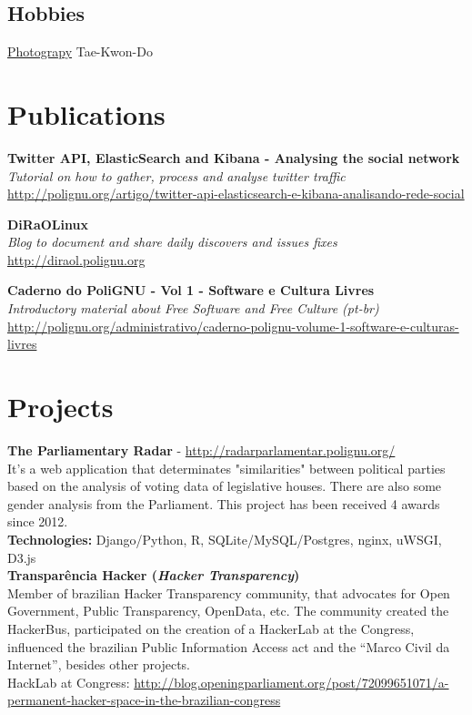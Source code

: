 \documentclass[]{friggeri-cv}
\begin{document}
\begin{aside}
  \section{Hobbies}
      \href{http://olhares.com/diraol}{Photograpy}
      Tae-Kwon-Do
\end{aside}

\section{Publications}
\textbf{Twitter API, ElasticSearch and Kibana - Analysing the social network}\\
\emph{Tutorial on how to gather, process and analyse twitter traffic}\\
\href{http://polignu.org/artigo/twitter-api-elasticsearch-e-kibana-analisando-rede-social}{http://polignu.org/artigo/twitter-api-elasticsearch-e-kibana-analisando-rede-social}

\textbf{DiRaOLinux}\\
\emph{Blog to document and share daily discovers and issues fixes}\\
\href{http://diraol.polignu.org}{http://diraol.polignu.org}

\textbf{Caderno do PoliGNU - Vol 1 - Software e Cultura Livres}\\
\emph{Introductory material about Free Software and Free Culture (pt-br)}\\
\href{http://polignu.org/administrativo/caderno-polignu-volume-1-software-e-culturas-livres}{http://polignu.org/administrativo/caderno-polignu-volume-1-software-e-culturas-livres}

\section{Projects}
\textbf{The Parliamentary Radar} - \href{http://radarparlamentar.polignu.org/}{http://radarparlamentar.polignu.org/}\\
It's a web application that determinates "similarities" between political parties based on the analysis of voting data of legislative houses. There are also some gender analysis from the Parliament. 
This project has been received 4 awards since 2012.\\
\textbf{Technologies:} Django/Python, R, SQLite/MySQL/Postgres, nginx, uWSGI, D3.js\\

\textbf{Transparência Hacker (\textit{Hacker Transparency})}\\
Member of brazilian Hacker Transparency community, that advocates for Open Government, Public Transparency, OpenData, etc. The community created the HackerBus, participated on the creation of a HackerLab at the Congress, influenced the brazilian Public Information Access act and the ``Marco Civil da Internet'', besides other projects.\\
HackLab at Congress: \href{http://blog.openingparliament.org/post/72099651071/a-permanent-hacker-space-in-the-brazilian-congress}{http://blog.openingparliament.org/post/72099651071/a-permanent-hacker-space-in-the-brazilian-congress}
\end{document}
